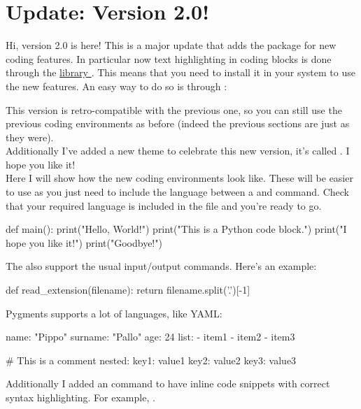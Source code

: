 \documentclass[../main.tex]{subfiles}
\begin{document}
\section{Update: Version 2.0! }

Hi, version 2.0 is here! This is a major update that adds the 
package for new coding features. In particular now text highlighting in coding
blocks is done through the 
\href{https://pygments.org/}{ library }
. This means that you need to
install it in your system to use the new features. An easy way to do so is
through :

\begin{cbox}
\end{cbox}

This version is retro-compatible with the previous one, so you can still use the
previous coding environments as before (indeed the previous sections are just as
they were).\\
Additionally I've added a new theme to celebrate this new version, it's called
. I hope you
like it!\\
Here I will show how the new coding environments look like. These will be easier
to use as you just need to include the language between a  and
 command. Check that your required language is included in the
 file and you're ready to go.

\begin{python}
def main():
	print("Hello, World!")
	print("This is a Python code block.")
	print("I hope you like it!")
	print("Goodbye!")
\end{python}

The also support the usual input/output commands. Here's an example:

\begin{python}[title=Python code block,
	input={input.txt},
	output=The file extension
]
def read_extension(filename):
	return filename.split('.')[-1]
\end{python}

Pygments supports a lot of languages, like YAML:

\begin{yaml}
name: "Pippo"
surname: "Pallo"
age: 24
list:
	- item1
	- item2
	- item3

# This is a comment
nested:
	key1: value1
	key2: value2
	key3: value3
\end{yaml}

Additionally I added an  command to have inline code snippets with
correct syntax highlighting. For example, .
\end{document}
